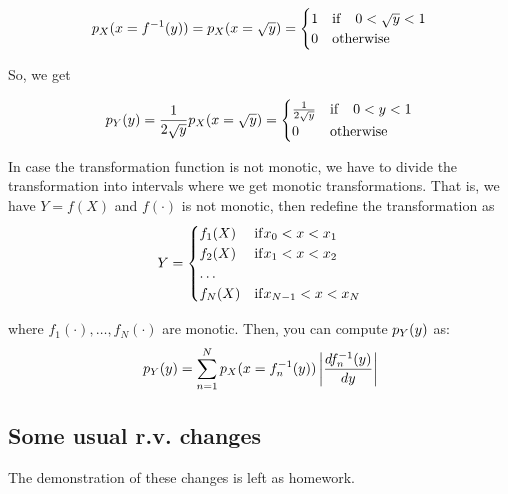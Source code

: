 \begin{eqnarray} 
p_X(x = f^{-1}(y)) = p_X(x = \sqrt{y}) = \begin{cases}
1 & {\rm if} \quad 0<\sqrt{y}<1\\
0 & {\rm otherwise} 
\end{cases}  \nonumber
\end{eqnarray} 

So, we get

\begin{eqnarray} 
p_Y(y)  = \frac{1}{2\sqrt{y}} p_X(x = \sqrt{y}) = \begin{cases}
\frac{1}{2\sqrt{y}} & {\rm if} \quad 0<y<1\\
0 & {\rm otherwise} 
\end{cases}  \nonumber
\end{eqnarray} 

In case the transformation function is not monotic, we have to divide the transformation into intervals where we get monotic transformations. That is, we have $Y = f(X)$ and $f(\cdot)$ is not monotic, then redefine the transformation as
\begin{eqnarray} 
Y = \begin{cases} 
f_1(X) & {\rm if } x_0 < x <x_1 \\
f_2(X) & {\rm if } x_1 < x <x_2 \\
\ldots  &  \\
f_N(X) & {\rm if } x_{N-1} < x <x_N \\
\end{cases}  \nonumber
\end{eqnarray}

where $f_1(\cdot),\ldots, f_N(\cdot) $ are monotic. Then, you can compute $p_Y(y)$ as:
\begin{eqnarray} 
p_Y(y) =  \sum_{n=1}^N p_X(x = f_n^{-1}(y))  \left| \frac{df_n^{-1}(y)}{dy}\right| \nonumber
\end{eqnarray} 

\subsection{Some usual r.v. changes}

The demonstration of these changes is left as homework.

